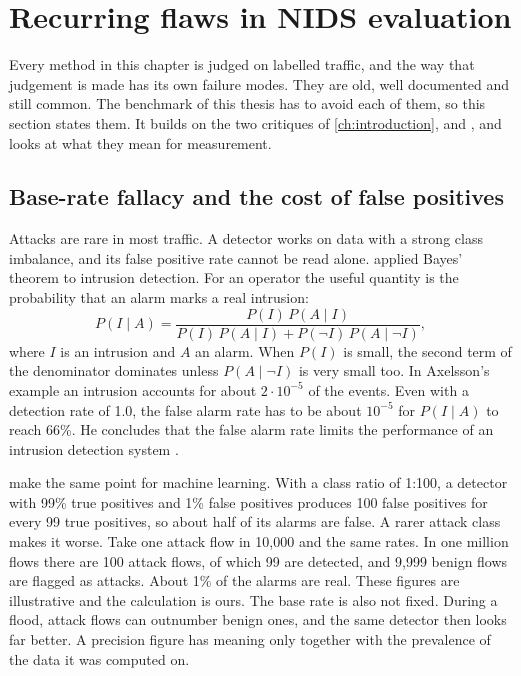 \section{Recurring flaws in NIDS evaluation}
\label{sec:evaluation-practice}

Every method in this chapter is judged on labelled traffic, and the way that
judgement is made has its own failure modes. They are old, well documented
and still common. The benchmark of this thesis has to avoid each of them, so
this section states them. It builds on the two critiques of
\cref{ch:introduction}, \citet{sommer2010outside} and
\citet{arp2022dosdonts}, and looks at what they mean for measurement.

\subsection{Base-rate fallacy and the cost of false positives}
\label{sec:base-rate-false-positives}

Attacks are rare in most traffic. A detector works on data with a strong
class imbalance, and its false positive rate cannot be read alone.
\citet{axelsson2000baserate} applied Bayes' theorem to intrusion detection.
For an operator the useful quantity is the probability that an alarm marks a
real intrusion:
\[
P(I \mid A) = \frac{P(I)\,P(A \mid I)}
  {P(I)\,P(A \mid I) + P(\neg I)\,P(A \mid \neg I)},
\]
where $I$ is an intrusion and $A$ an alarm. When $P(I)$ is small, the second
term of the denominator dominates unless $P(A \mid \neg I)$ is very small
too. In Axelsson's example an intrusion accounts for about $2 \cdot 10^{-5}$
of the events. Even with a detection rate of 1.0, the false alarm rate has to
be about $10^{-5}$ for $P(I \mid A)$ to reach 66\%. He concludes that the
false alarm rate limits the performance of an intrusion detection system
\citep{axelsson2000baserate}.

\citet{arp2022dosdonts} make the same point for machine learning. With a
class ratio of 1:100, a detector with 99\% true positives and 1\% false
positives produces 100 false positives for every 99 true positives, so about
half of its alarms are false. A rarer attack class makes it worse. Take one
attack flow in 10{,}000 and the same rates. In one million flows there are
100 attack flows, of which 99 are detected, and 9{,}999 benign flows are
flagged as attacks. About 1\% of the alarms are real. These figures are
illustrative and the calculation is ours. The base rate is also not fixed.
During a flood, attack flows can outnumber benign ones, and the same
detector then looks far better. A precision figure has meaning only together
with the prevalence of the data it was computed on.

